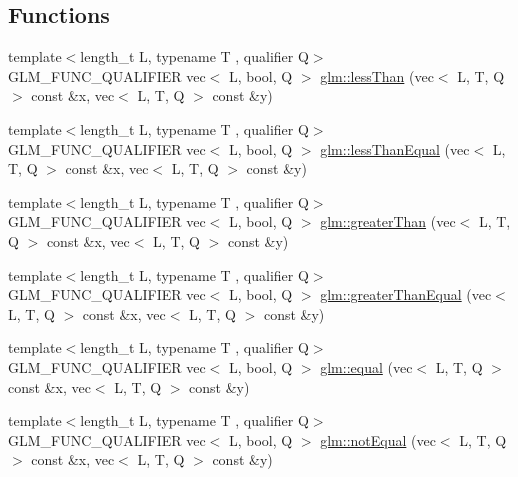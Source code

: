 \subsection*{Functions}
\begin{DoxyCompactItemize}
\item 
{\footnotesize template$<$length\+\_\+t L, typename T , qualifier Q$>$ }\\G\+L\+M\+\_\+\+F\+U\+N\+C\+\_\+\+Q\+U\+A\+L\+I\+F\+I\+ER vec$<$ L, bool, Q $>$ \hyperlink{group__core__func__vector__relational_ga314be073c42278ccb6fe7a7958213824}{glm\+::less\+Than} (vec$<$ L, T, Q $>$ const \&x, vec$<$ L, T, Q $>$ const \&y)
\item 
{\footnotesize template$<$length\+\_\+t L, typename T , qualifier Q$>$ }\\G\+L\+M\+\_\+\+F\+U\+N\+C\+\_\+\+Q\+U\+A\+L\+I\+F\+I\+ER vec$<$ L, bool, Q $>$ \hyperlink{group__core__func__vector__relational_ga51bf75522dbe1fa5e7806eb9b825ab6a}{glm\+::less\+Than\+Equal} (vec$<$ L, T, Q $>$ const \&x, vec$<$ L, T, Q $>$ const \&y)
\item 
{\footnotesize template$<$length\+\_\+t L, typename T , qualifier Q$>$ }\\G\+L\+M\+\_\+\+F\+U\+N\+C\+\_\+\+Q\+U\+A\+L\+I\+F\+I\+ER vec$<$ L, bool, Q $>$ \hyperlink{group__core__func__vector__relational_gad3a3a7d228da3754c328c9a778f6df56}{glm\+::greater\+Than} (vec$<$ L, T, Q $>$ const \&x, vec$<$ L, T, Q $>$ const \&y)
\item 
{\footnotesize template$<$length\+\_\+t L, typename T , qualifier Q$>$ }\\G\+L\+M\+\_\+\+F\+U\+N\+C\+\_\+\+Q\+U\+A\+L\+I\+F\+I\+ER vec$<$ L, bool, Q $>$ \hyperlink{group__core__func__vector__relational_ga271038c5290184127754bda0ae91a5bd}{glm\+::greater\+Than\+Equal} (vec$<$ L, T, Q $>$ const \&x, vec$<$ L, T, Q $>$ const \&y)
\item 
{\footnotesize template$<$length\+\_\+t L, typename T , qualifier Q$>$ }\\G\+L\+M\+\_\+\+F\+U\+N\+C\+\_\+\+Q\+U\+A\+L\+I\+F\+I\+ER vec$<$ L, bool, Q $>$ \hyperlink{group__core__func__vector__relational_ga774f9e3a93c913f1e7c215a549707d59}{glm\+::equal} (vec$<$ L, T, Q $>$ const \&x, vec$<$ L, T, Q $>$ const \&y)
\item 
{\footnotesize template$<$length\+\_\+t L, typename T , qualifier Q$>$ }\\G\+L\+M\+\_\+\+F\+U\+N\+C\+\_\+\+Q\+U\+A\+L\+I\+F\+I\+ER vec$<$ L, bool, Q $>$ \hyperlink{group__core__func__vector__relational_gac5a72a973c81dc697dd8bb5d218e8251}{glm\+::not\+Equal} (vec$<$ L, T, Q $>$ const \&x, vec$<$ L, T, Q $>$ const \&y)

\end{DoxyCompactItemize}
